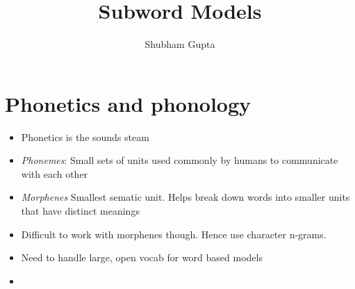 \documentclass[a4paper]{article}
\title{Subword Models}
\author{Shubham Gupta}
\begin{document}
\maketitle
\section{Phonetics and phonology}
\begin{itemize}
    \item Phonetics is the sounds steam
    \item \textit{Phonemes}: Small sets of units used commonly by humans to communicate with each other
    \item \textit{Morphenes} Smallest sematic unit. Helps break down words into smaller units that have distinct meanings
    \item Difficult to work with morphenes though. Hence use character n-grams.
    \item Need to handle large, open vocab for word based models
    \item 
\end{itemize}
\end{document}
